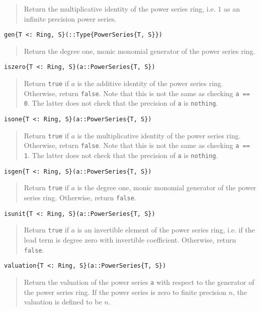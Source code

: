 \documentclass[a4paper,10pt]{article}
\newcommand{\code}{\lstinline}
\newcommand{\desc}[1]{\vspace{-3mm}\begin{quote}#1\end{quote}}
\begin{document}
{{\desc{Return the multiplicative identity of the power series ring, i.e. $1$ as an
infinite precision power series.}

\begin{lstlisting}
gen{T <: Ring, S}(::Type{PowerSeries{T, S}})
\end{lstlisting}

\desc{Return the degree one, monic monomial generator of the power series
ring.}

\begin{lstlisting}
iszero{T <: Ring, S}(a::PowerSeries{T, S})
\end{lstlisting}

\desc{Return \code{true} if $a$ is the additive identity of the power series
ring. Otherwise, return \code{false}. Note that this is not the same as
checking \code{a == 0}. The latter does not check that the precision of
\code{a} is \code{nothing}.}

\begin{lstlisting}
isone{T <: Ring, S}(a::PowerSeries{T, S})
\end{lstlisting}

\desc{Return \code{true} if $a$ is the multiplicative identity of the power
series ring. Otherwise, return \code{false}. Note that this is not the same
as checking \code{a == 1}. The latter does not check that the precision of
\code{a} is \code{nothing}.}

\begin{lstlisting}
isgen{T <: Ring, S}(a::PowerSeries{T, S})
\end{lstlisting}

\desc{Return \code{true} if $a$ is the degree one, monic monomial generator of
the power series ring. Otherwise, return \code{false}.}

\begin{lstlisting}
isunit{T <: Ring, S}(a::PowerSeries{T, S})
\end{lstlisting}

\desc{Return \code{true} if $a$ is an invertible element of the power series
ring, i.e. if the lead term is degree zero with invertible coefficient.
Otherwise, return \code{false}.}

\begin{lstlisting}
valuation{T <: Ring, S}(a::PowerSeries{T, S})
\end{lstlisting}

\desc{Return the valuation of the power series \code{a} with respect to the
generator of the power series ring. If the power series is zero to finite
precision $n$, the valuation is defined to be $n$.}

}}
\end{document}
